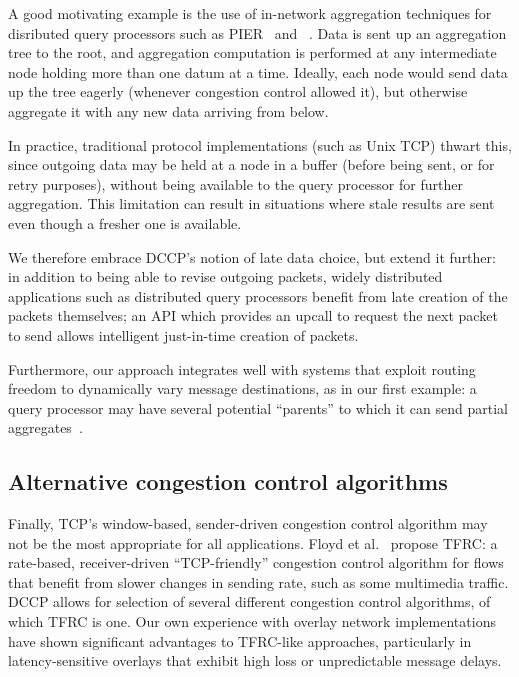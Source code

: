 A good motivating example is the use of in-network
aggregation techniques for disributed query processors such as
PIER~\cite{pier-cidr} and ~\cite{Yalagandula2004}.  Data is sent
up an aggregation tree to the
root, and aggregation computation is performed at any intermediate
node holding more than one datum at a time.  Ideally, each node
would send data up the tree eagerly (whenever congestion
control allowed it), but otherwise aggregate it with any new data
arriving from below. 

In practice, traditional protocol implementations
(such as Unix TCP) thwart this, since outgoing data may be held at a
node in a buffer (before being sent, or for retry purposes), without
being available to the query processor for further aggregation. This limitation
can result in situations where stale results are sent even though a fresher one
is available. 

We therefore embrace DCCP's notion of late data choice, but extend
it further: in addition to being able to revise outgoing packets, widely
distributed applications such as distributed query processors
benefit from late creation of the packets themselves; an API which
provides an upcall to request the next packet to send allows
intelligent just-in-time creation of packets.   

Furthermore, our approach integrates well with systems that exploit
routing freedom to dynamically vary message destinations, as in our
first example: a query processor may have several potential
``parents'' to which it can send partial aggregates~\cite{gibbons-sensys04}. 

\subsection{Alternative congestion control algorithms}

Finally, TCP's window-based, sender-driven congestion control
algorithm may not be the most appropriate for all applications.  Floyd
et al.~\cite{floyd00equationbased} propose TFRC: a rate-based,
receiver-driven ``TCP-friendly'' congestion control algorithm for
flows that benefit from slower changes in sending rate, such as some
multimedia traffic.  DCCP allows for selection of several different
congestion control algorithms, of which TFRC is one. 
Our own experience with overlay network implementations have shown
significant advantages to TFRC-like approaches, particularly in
latency-sensitive overlays that exhibit high loss or unpredictable
message delays. 

